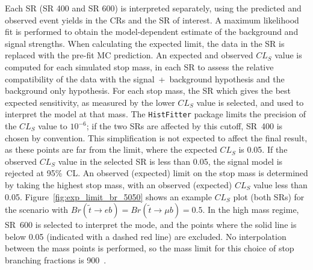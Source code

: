 Each SR (SR 400 and SR 600) is interpreted separately, using the predicted and
observed event yields in the CRs and the SR of interest.
A maximum likelihood fit is performed to obtain the model-dependent estimate of
the background and signal strengths.
When calculating the expected limit, the data in the SR is replaced with the
pre-fit MC prediction.
An expected and observed $CL_S$ value is computed for each simulated stop mass,
in each SR to assess the relative compatibility of the data with the
signal~+~background hypothesis and the background only hypothesis.
For each stop mass, the SR which gives the best expected sensitivity, as
measured by the lower $CL_S$ value is selected, and used to interpret the model
at that mass.
The \texttt{HistFitter} package limits the precision of the $CL_S$ value
to $10^{-6}$; if the two SRs are affected by this cutoff, SR~400 is chosen by
convention.
This simplification is not expected to affect the final result, as these points
are far from the limit, where the expected $CL_S$ is 0.05.
If the observed $CL_S$ value in the selected SR is less than 0.05, the signal
model is rejected at 95\%~CL.
An observed (expected) limit on the stop mass is determined by taking the
highest stop mass, with an observed (expected) $CL_S$ value less than 0.05.
Figure~\ref{fig:exp_limit_br_5050} shows an example $CL_S$ plot (both SRs)
for the scenario with $Br(\tilde{t} \to eb) = Br(\tilde{t} \to \mu b) = 0.5$.
In the high mass regime, SR~600 is selected to interpret the mode, and
the points where the solid line is below 0.05 (indicated with a dashed red line)
are excluded.
No interpolation between the mass points is performed, so the mass limit for
this choice of stop branching fractions is 900~\GeV.


